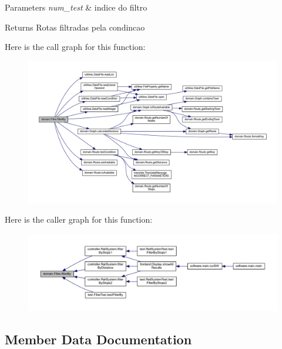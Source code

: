 \begin{DoxyParams}{Parameters}
{\em num\+\_\+test} & indice do filtro \\
\hline
\end{DoxyParams}
\begin{DoxyReturn}{Returns}
Rotas filtradas pela condincao 
\end{DoxyReturn}
Here is the call graph for this function\+:\nopagebreak
\begin{figure}[H]
\begin{center}
\leavevmode
\includegraphics[width=350pt]{classdomain_1_1_filter_a5935a1a7d6f7b13de220ed9b6547b897_cgraph}
\end{center}
\end{figure}
Here is the caller graph for this function\+:\nopagebreak
\begin{figure}[H]
\begin{center}
\leavevmode
\includegraphics[width=350pt]{classdomain_1_1_filter_a5935a1a7d6f7b13de220ed9b6547b897_icgraph}
\end{center}
\end{figure}


\subsection{Member Data Documentation}
\mbox{\label{classdomain_1_1_filter_afdd7492ce4c44ba22ad16e3ad819a70c}} 
